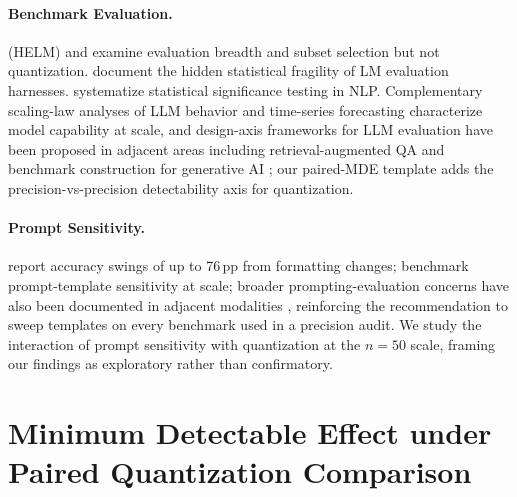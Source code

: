 \documentclass{article}
\begin{document}
\paragraph{Benchmark Evaluation.}
\citet{liang2023holistic} (HELM) and \citet{polo2024tinybenchmarks} examine evaluation breadth and subset selection but not quantization. \citet{biderman2024lessons} document the hidden statistical fragility of LM evaluation harnesses. \citet{dror2018hitchhiker} systematize statistical significance testing in NLP. Complementary scaling-law analyses of LLM behavior \citep{shi2026intrinsic} and time-series forecasting \citep{shi2024scaling} characterize model capability at scale, and design-axis frameworks for LLM evaluation have been proposed in adjacent areas including retrieval-augmented QA \citep{ji2026retrieval} and benchmark construction for generative AI \citep{luo2026biasig}; our paired-MDE template adds the precision-vs-precision detectability axis for quantization.

\paragraph{Prompt Sensitivity.}
\citet{sclar2024quantifying} report accuracy swings of up to 76\,pp from formatting changes; \citet{mizrahi2024prompt} benchmark prompt-template sensitivity at scale; broader prompting-evaluation concerns have also been documented in adjacent modalities \citep{luo2026atelierevalagenticevaluationhumans}, reinforcing the recommendation to sweep templates on every benchmark used in a precision audit. We study the interaction of prompt sensitivity with quantization at the $n{=}50$ scale, framing our findings as exploratory rather than confirmatory.

\section{Minimum Detectable Effect under Paired Quantization Comparison}
\label{sec:mde}
\end{document}
